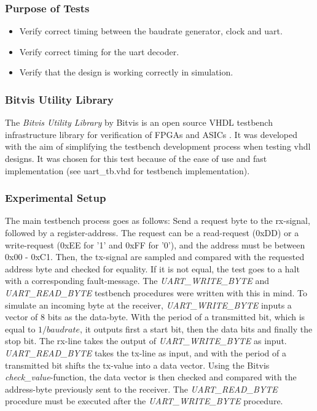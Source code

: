 \documentclass[main.tex]{subfiles}
\begin{document}
\subsubsection{Purpose of Tests}

\begin{itemize}\setlength{\itemsep}{10pt}
\item Verify correct timing between the baudrate generator, clock and uart.
\item Verify correct timing for the uart decoder.
\item Verify that the design is working correctly in simulation.
\end{itemize}

\subsubsection{Bitvis Utility Library}
The \textit{Bitvis Utility Library} by Bitvis is an open source VHDL testbench infrastructure library for verification of FPGAs and ASICs \cite{bitvis16}. It was developed with the aim of simplifying the testbench development process when testing \acrshort{vhdl} designs. It was chosen for this test because of the ease of use and fast implementation (see uart\_tb.vhd for testbench implementation).\\

\subsubsection{Experimental Setup}
The main testbench process goes as follows: Send a request byte to the rx-signal, followed by a register-address. The request can be a read-request (0xDD) or a write-request (0xEE for '1' and 0xFF for '0'), and the address must be between 0x00 - 0xC1. Then, the tx-signal are sampled and compared with the requested address byte and checked for equality. If it is not equal, the test goes to a halt with a corresponding fault-message. The \textit{UART\_WRITE\_BYTE} and \textit{UART\_READ\_BYTE} testbench procedures were written with this in mind. To simulate an incoming byte at the receiver, \textit{UART\_WRITE\_BYTE} inputs a vector of 8 bits as the data-byte. With the period of a transmitted bit, which is equal to $1/baud rate$, it outputs first a start bit, then the data bits and finally the stop bit. The rx-line takes the output of \textit{UART\_WRITE\_BYTE} as input. \textit{UART\_READ\_BYTE} takes the tx-line as input, and with the period of a transmitted bit shifts the tx-value into a data vector. Using the Bitvis \textit{check\_value}-function, the data vector is then checked and compared with the address-byte previously sent to the receiver. The \textit{UART\_READ\_BYTE} procedure must be executed after the \textit{UART\_WRITE\_BYTE} procedure. \\
\end{document}
